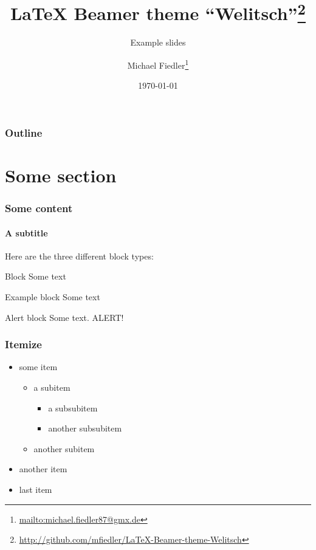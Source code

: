 \documentclass[12pt]{beamer}
\title{\LaTeX{} Beamer theme ``Welitsch''\footnote{\url{http://github.com/mfiedler/LaTeX-Beamer-theme-Welitsch}}}
\subtitle{Example slides}
\author{Michael Fiedler\footnote{\url{mailto:michael.fiedler87@gmx.de}}}
\date{\today}
\begin{document}
\maketitle


\begin{frame}
	\frametitle{Outline}
	\tableofcontents
\end{frame}


\section{Some section}
\begin{frame}
\frametitle{Some content}
\framesubtitle{A subtitle}

Here are the three different block types:

\begin{block}{Block}
Some text
\end{block}

\begin{exampleblock}{Example block}
Some text
\end{exampleblock}

\begin{alertblock}{Alert block}
Some text. \alert{ALERT!}
\end{alertblock}
\end{frame}

\begin{frame}
\frametitle{Itemize}

\begin{itemize}
\item some item
\begin{itemize}
\item a subitem
\begin{itemize}
\item a subsubitem
\item another subsubitem
\end{itemize}
\item another subitem
\end{itemize}
\item another item
\item last item
\end{itemize}
\end{frame}
\end{document}
